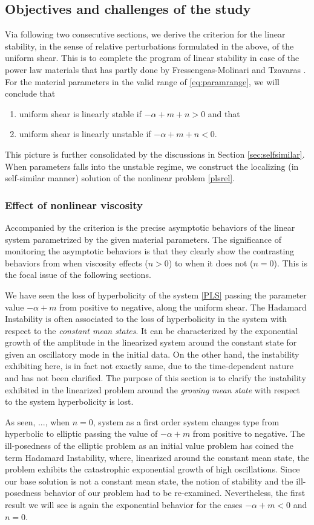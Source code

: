 \documentclass[a4paper,11pt]{article}
\def\blue{\color{blue}}
\theoremstyle{remark}
\begin{document}
\subsection{Objectives and challenges of the study}

Via following two consecutive sections, we derive the criterion for the linear stability, in the sense of relative perturbations formulated in the above, of the uniform shear. This is to complete the program of linear stability in case of the power law materials that has partly done by Fressengeas-Molinari \cite{FM87} and Tzavaras \cite{Tzavaras91} . For the material parameters in the valid range of \eqref{eq:paramrange}, we will conclude that
\begin{enumerate}
 \item uniform shear is linearly stable if $-\alpha+m+n>0$ and that
 \item uniform shear is linearly unstable if $-\alpha+m+n<0$.
\end{enumerate}
This picture is further consolidated by the discussions in Section  \ref{sec:selfsimilar}. When parameters falls into the unstable regime, we construct the localizing (in self-similar manner) solution of the nonlinear problem \eqref{plsrel}.
\subsubsection{Effect of nonlinear viscosity}
Accompanied by the criterion is the precise asymptotic behaviors of the linear system parametrized by the given material parameters. The significance of monitoring the asymptotic behaviors is that they clearly show the contrasting behaviors from when viscosity effects ($n>0$) to when it does not ($n=0$). This is the focal issue of the following sections.
{\blue
We have seen the loss of hyperbolicity of the system \eqref{PLS} passing the parameter value $-\alpha+m$ from positive to negative, along the uniform shear. The Hadamard Instability is often associated to the loss of hyperbolicity in the system with respect to the {\it constant mean states}. It can be characterized by the exponential growth of the amplitude in the linearized system around the constant state for given an oscillatory mode in the initial data. On the other hand, the instability exhibiting here, is in fact not exactly same, due to the time-dependent nature and has not been clarified. The purpose of this section is to clarify the instability exhibited in the linearized problem around the {\it growing mean state} with respect to the system hyperbolicity is lost.


As seen, ..., when $n=0$, system as a first order system changes type from hyperbolic to elliptic passing the value of $-\alpha+m$ from positive to negative. The ill-posedness of the elliptic problem as an initial value problem has coined the term Hadamard Instability, where, linearized around the constant mean state, the problem exhibits the catastrophic exponential growth of high oscillations. Since our base solution is not a constant mean state, the notion of stability and the ill-posedness behavior of our problem had to be re-examined. Nevertheless, the first result we will see is again the exponential behavior for the cases $-\alpha+m<0$ and $n=0$.}
\end{document}
